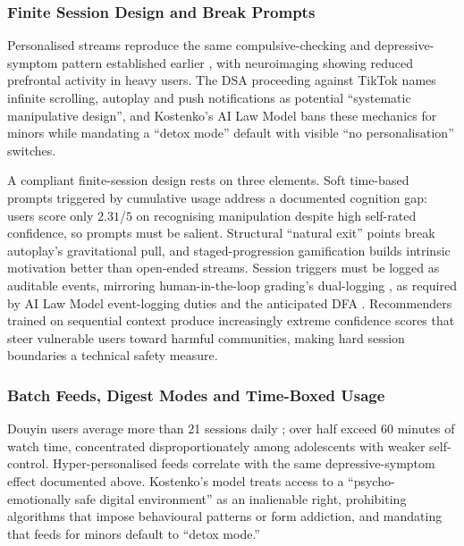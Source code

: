 \documentclass[11pt]{article}
\begin{document}
\subsubsection{Finite Session Design and Break Prompts}
\label{sec:finite_session_break_prompts} Personalised streams reproduce the same compulsive-checking and depressive-symptom pattern established earlier \parencites[2]{3303310}[20]{3303310}, with neuroimaging showing reduced prefrontal activity in heavy users. The DSA proceeding against TikTok names \parencites[2]{8958037} infinite scrolling, autoplay and push notifications as potential ``systematic manipulative design'', and Kostenko's AI Law Model bans \parencites[223]{2977039}[221]{2977039} these mechanics for minors while mandating a ``detox mode'' default with visible ``no personalisation'' switches.

A compliant finite-session design rests on three elements. Soft time-based prompts triggered by cumulative usage address a documented cognition gap: users score only $2.31$/$5$ on recognising manipulation \parencites[31]{9360054} despite high self-rated confidence, so prompts must be salient. Structural ``natural exit'' points break autoplay's gravitational pull, and staged-progression gamification \parencites[9]{5645864} builds intrinsic motivation better than open-ended streams. Session triggers must be logged as auditable events, mirroring human-in-the-loop grading's dual-logging \parencites[20]{6805789}, as required by AI Law Model event-logging duties \parencites[19.5]{2977039}[228]{2977039} and the anticipated DFA \parencites[390]{7896734}[2248]{6502223}. Recommenders trained on sequential context produce increasingly extreme confidence scores \parencites[4]{8020829} that steer vulnerable users toward harmful communities, making hard session boundaries a technical safety measure.

\subsubsection{Batch Feeds, Digest Modes and Time-Boxed Usage}
\label{sec:batch_feeds_digest_timeboxed} Douyin users average more than 21 sessions daily \parencites[2]{8958037}[3]{8958037}; over half exceed 60 minutes of watch time, concentrated disproportionately among adolescents with weaker self-control. Hyper-personalised feeds correlate \parencites[2]{3303310}[20]{3303310} with the same depressive-symptom effect documented above. Kostenko's model treats \parencites[119]{2977039}[223]{2977039}[221]{2977039} access to a ``psycho-emotionally safe digital environment'' as an inalienable right, prohibiting algorithms that impose behavioural patterns or form addiction, and mandating that feeds for minors default to ``detox mode.''
\end{document}
